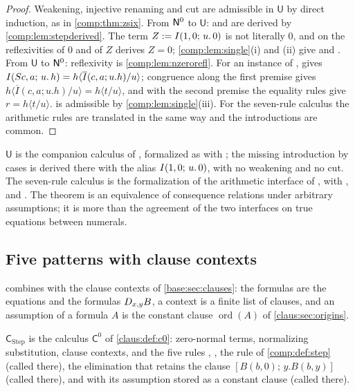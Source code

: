 \begin{proof}
Weakening, injective renaming and cut are admissible in $\mathsf{U}$ by
direct induction, as in \cref{comp:thm:zsix}. From $\mathsf{N}^{0}$ to
$\mathsf{U}$:  and  are derived by
\cref{comp:lem:stepderived}. The term $Z\mathrel{:=}I(1,0;\,u.\,0)$ is not
literally $0$, and  on the reflexivities of $0$ and of $Z$
derives $Z=0$; \cref{comp:lem:single}(i) and (ii) give  and
. From $\mathsf{U}$ to $\mathsf{N}^{0}$: reflexivity is
\cref{comp:lem:nzerorefl}. For an instance of ,
 gives
$I(S c,a;\,u.\,h)=h\langle\overline{I}(c,a;u.h)/u\rangle$; congruence
along the first premise gives
$h\langle\overline{I}(c,a;u.h)/u\rangle=h\langle t/u\rangle$, and with the
second premise the equality rules give $r=h\langle t/u\rangle$.
 is admissible by \cref{comp:lem:single}(iii). For the
seven-rule calculus the arithmetic rules are translated in the same way and
the introductions are common.
\end{proof}

\begin{remark}
$\mathsf{U}$ is the companion calculus of ,
formalized as  with ; the missing
introduction by cases is derived there with the alias $I(1,0;\,u.\,0)$,
with no weakening and no cut. The seven-rule calculus is the formalization
 of the arithmetic interface of , with
,  and . The
theorem is an equivalence of consequence relations under arbitrary
assumptions; it is more than the agreement of the two interfaces on true
equations between numerals.
\end{remark}

\subsection{Five patterns with clause contexts}
\label{comp:sec:clausal}

 combines  with the clause contexts of
\cref{base:sec:clauses}: the formulas are the equations and the formulas
$D_{x,y}B$, a context is a finite list of clauses, and an assumption of a
formula $A$ is the constant clause $\operatorname{ord}(A)$ of
\cref{claus:sec:origins}.

\begin{definition}
\label{comp:def:cstep}
$\mathsf{C}_{\mathrm{Step}}$ is the calculus $\mathsf{C}^{0}$ of
\cref{claus:def:c0}: zero-normal terms, normalizing substitution, clause
contexts, and the five rules , , the rule
 of \cref{comp:def:step} (called  there), the
elimination  that retains the clause $[B(b,0);\,y.B(b,y)]$
(called  there), and  with its assumption
stored as a constant clause (called  there).
\end{definition}

